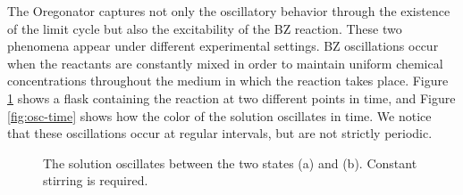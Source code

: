 \documentclass[twocolumn,amsmath,amssymb,aps]{revtex4}
\begin{document}
The Oregonator captures not only the oscillatory behavior through the existence of the limit cycle but also the excitability of the BZ reaction. These two phenomena appear under different experimental settings. BZ oscillations occur when the reactants are constantly mixed in order to maintain uniform chemical concentrations throughout the medium in which the reaction takes place.  Figure \ref{fig:Osc} shows a flask containing the reaction at two different points in time, and Figure \ref{fig:osc-time} shows how the color of the solution oscillates in time. We notice that these oscillations occur at regular intervals, but are not strictly periodic. 
\begin{figure}
	\centering
	\caption{The solution oscillates between the two states (a) and (b). Constant stirring is required.}
	\label{fig:Osc}
\end{figure}
\end{document}

